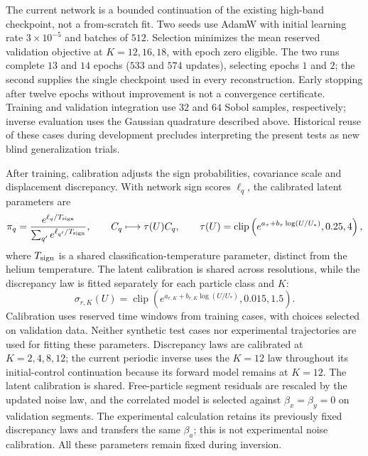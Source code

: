 \documentclass[11pt]{article}
\numberwithin{equation}{section}
\begin{document}
The current network is a bounded continuation of the existing high-band checkpoint, not a from-scratch fit. Two seeds use AdamW with initial learning rate $3\times10^{-5}$ and batches of $512$. Selection minimizes the mean reserved validation objective at $K=12,16,18$, with epoch zero eligible. The two runs complete $13$ and $14$ epochs ($533$ and $574$ updates), selecting epochs $1$ and $2$; the second supplies the single checkpoint used in every reconstruction. Early stopping after twelve epochs without improvement is not a convergence certificate. Training and validation integration use $32$ and $64$ Sobol samples, respectively; inverse evaluation uses the Gaussian quadrature described above. Historical reuse of these cases during development precludes interpreting the present tests as new blind generalization trials.

After training, calibration adjusts the sign probabilities, covariance scale and displacement discrepancy. With network sign scores $\ell_q$, the calibrated latent parameters are
\begin{equation}
 \pi_q=\frac{e^{\ell_q/T_{\rm sign}}}{\sum_{q'}e^{\ell_{q'}/T_{\rm sign}}},
 \qquad C_q\longmapsto\tau(U)C_q,
 \qquad
 \tau(U)=\operatorname{clip}\left(e^{a_\tau+b_\tau\log(U/U_*)},0.25,4\right),
 \label{eq:latentcalibration}
\end{equation}
where $T_{\rm sign}$ is a shared classification-temperature parameter, distinct from the helium temperature. The latent calibration is shared across resolutions, while the discrepancy law is fitted separately for each particle class and $K$:
\begin{equation}
 \sigma_{r,K}(U)=\operatorname{clip}
 \left(e^{a_{r,K}+b_{r,K}\log(U/U_*)},0.015,1.5\right).
 \label{eq:noisecalibration}
\end{equation}
Calibration uses reserved time windows from training cases, with choices selected on validation data. Neither synthetic test cases nor experimental trajectories are used for fitting these parameters. Discrepancy laws are calibrated at $K=2,4,8,12$; the current periodic inverse uses the $K=12$ law throughout its initial-control continuation because its forward model remains at $K=12$. The latent calibration is shared. Free-particle segment residuals are rescaled by the updated noise law, and the correlated model is selected against $\beta_x=\beta_y=0$ on validation segments. The experimental calculation retains its previously fixed discrepancy laws and transfers the same $\beta_a$; this is not experimental noise calibration. All these parameters remain fixed during inversion.
\end{document}
